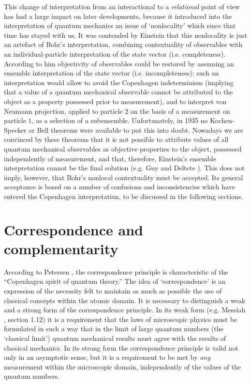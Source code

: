 \documentclass[12pt]{article}
\begin{document}
This change of interpretation from an interactional to a {\em
relational} point of view has had a large impact on later
developments, because it introduced into the interpretation of
quantum mechanics an issue of `nonlocality' which since that time
has stayed with us. It was contended by Einstein that this
nonlocality is just an artefact of Bohr's interpretation,
combining contextuality of observables with an individual-particle
interpretation of the state vector (i.e. completeness). According
to him objectivity of observables could be restored by assuming an
ensemble interpretation of the state vector (i.e. incompleteness):
such an interpretation would allow to avoid the Copenhagen
indeterminism (implying that a value of a quantum mechanical
observable cannot be attributed to the object as a property
possessed prior to measurement), and to interpret von Neumann
projection, applied to particle $2$ on the basis of a measurement
on particle $1$, as a selection of a subensemble. Unfortunately,
in 1935 no Kochen-Specker or Bell theorems were available to put
this into doubt. Nowadays we are convinced by these theorems that
it is not possible to attribute values of all quantum mechanical
observables as objective properties to the object, possessed
independently of measurement, and that, therefore, Einstein's
ensemble interpretation cannot be the final solution (e.g. Guy and
Deltete \cite{GuyDel90}). This does not imply, however, that
Bohr's nonlocal contextuality must be accepted. Its general
acceptance is based on a number of confusions and inconsistencies
which have entered the Copenhagen interpretation, to be discussed
in the following sections.

\section{Correspondence and complementarity} \label{sec2.5}
According to Petersen \cite{Pet}, the correspondence principle is
characteristic of the ``Copenhagen spirit of quantum theory.'' The
idea of `correspondence' is an expression of the necessity felt to
maintain as much as possible the use of classical concepts within
the atomic domain. It is necessary to distinguish a weak and a
strong form of the correspondence principle. In its weak form
(e.g. Messiah \cite{Messiah}, section 1.12) it is a requirement
that the laws of microscopic physics must be formulated in such a
way that in the limit of large quantum numbers (the `classical
limit') quantum mechanical results must agree with the results of
classical mechanics. In its strong form the correspondence
principle is valid not only in an asymptotic sense, but it is a
requirement to be met by {\em any} measurement within the
microscopic domain, independently of the values of the quantum
numbers.
\end{document}
